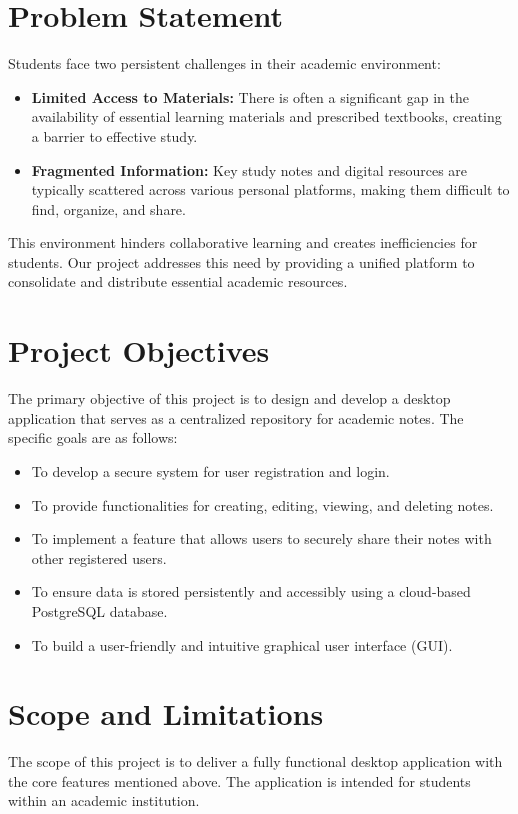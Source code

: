 \documentclass[12pt, a4paper]{report}
\begin{document}
\section{Problem Statement}
Students face two persistent challenges in their academic environment:
\begin{itemize}
    \item \textbf{Limited Access to Materials:} There is often a significant gap in the availability of essential learning materials and prescribed textbooks, creating a barrier to effective study.
    \item \textbf{Fragmented Information:} Key study notes and digital resources are typically scattered across various personal platforms, making them difficult to find, organize, and share.
\end{itemize}
This environment hinders collaborative learning and creates inefficiencies for students. Our project addresses this need by providing a unified platform to consolidate and distribute essential academic resources.

\section{Project Objectives}
The primary objective of this project is to design and develop a desktop application that serves as a centralized repository for academic notes. The specific goals are as follows:
\begin{itemize}
    \item To develop a secure system for user registration and login.
    \item To provide functionalities for creating, editing, viewing, and deleting notes.
    \item To implement a feature that allows users to securely share their notes with other registered users.
    \item To ensure data is stored persistently and accessibly using a cloud-based PostgreSQL database.
    \item To build a user-friendly and intuitive graphical user interface (GUI).
\end{itemize}

\section{Scope and Limitations}
The scope of this project is to deliver a fully functional desktop application with the core features mentioned above. The application is intended for students within an academic institution. 
\end{document}
